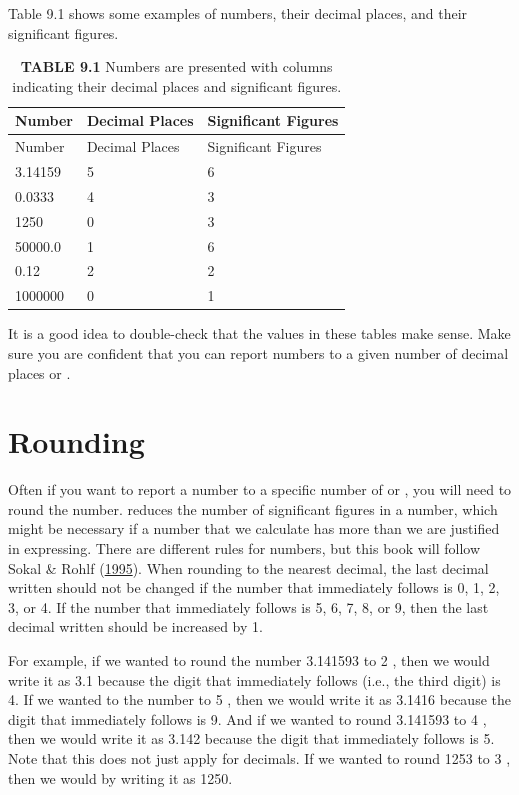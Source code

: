 \documentclass[
  openany]{krantz}
\begin{document}
Table 9.1 shows some examples of numbers, their decimal places, and their significant figures.

\begin{longtable}[]{@{}lll@{}}
\caption{\textbf{TABLE 9.1} Numbers are presented with columns indicating their decimal places and significant figures.}\tabularnewline
\toprule
Number & Decimal Places & Significant Figures \\
\midrule
\endfirsthead
\toprule
Number & Decimal Places & Significant Figures \\
\midrule
\endhead
3.14159 & 5 & 6 \\
0.0333 & 4 & 3 \\
1250 & 0 & 3 \\
50000.0 & 1 & 6 \\
0.12 & 2 & 2 \\
1000000 & 0 & 1 \\
\bottomrule
\end{longtable}

It is a good idea to double-check that the values in these tables make sense.
Make sure you are confident that you can report numbers to a given number of decimal places or .

\hypertarget{rounding}{%
\section{Rounding}\label{rounding}}

Often if you want to report a number to a specific number of  or , you will need to round the number.
 reduces the number of significant figures in a number, which might be necessary if a number that we calculate has more  than we are justified in expressing.
There are different rules for  numbers, but this book will follow Sokal \& Rohlf (\protect\hyperlink{ref-Sokal1995}{1995}).
When rounding to the nearest decimal, the last decimal written should not be changed if the number that immediately follows is 0, 1, 2, 3, or 4.
If the number that immediately follows is 5, 6, 7, 8, or 9, then the last decimal written should be increased by 1.

For example, if we wanted to round the number 3.141593 to 2 , then we would write it as 3.1 because the digit that immediately follows (i.e., the third digit) is 4.
If we wanted to  the number to 5 , then we would write it as 3.1416 because the digit that immediately follows is 9.
And if we wanted to round 3.141593 to 4 , then we would write it as 3.142 because the digit that immediately follows is 5.
Note that this does not just apply for decimals.
If we wanted to round 1253 to 3 , then we would  by writing it as 1250.
\end{document}

